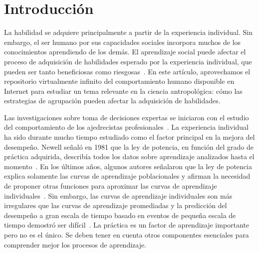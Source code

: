 \documentclass[a4paper,11pt]{book}
\theoremstyle{definition}
\begin{document}
\section{Introducci\'on}

La habilidad se adquiere principalmente a partir de la experiencia individual.
%
Sin embargo, el ser humano por sus capacidades sociales incorpora muchos de los conocimientos aprendiendo de los dem\'as.
%
El aprendizaje social puede afectar el proceso de adquisici\'on de habilidades esperado por la experiencia individual, que pueden ser tanto beneficiosas como riesgosas~\cite{Boyd2011}.
%
En este art\'iculo, aprovechamos el repositorio virtualmente infinito del comportamiento humano disponible en Internet para estudiar un tema relevante en la ciencia antropol\'ogica: c\'omo las estrategias de agrupaci\'on pueden afectar la adquisici\'on de habilidades.


Las investigaciones sobre toma de decisiones expertas se iniciaron con el estudio del comportamiento de los ajedrecistas profesionales~\cite{deGroot1978-thoughtAndChoiceInChess,chase1973-perceptionInChess,simon1974-howBigIsAChunk}.
%
La experiencia individual ha sido durante mucho tiempo estudiado como el factor principal en la mejora del desempe\~no.
%
Newell se\~nal\'o en 1981 que la ley de potencia, en funci\'on del grado de pr\'actica adquirida, describ\'ia todos los datos sobre aprendizaje analizados hasta el momento~\cite{Newell1981}.
%
En los \'ultimos a\~nos, algunos autores se\~nalaron que la ley de potencia explica solamente las curvas de aprendizaje poblacionales y afirman la necesidad de proponer otras funciones para aproximar las curvas de aprendizaje individuales~\cite{heathcote2000-powerLawRepealedExponentialLawOfPractice}.
%
Sin embargo, las curvas de aprendizaje individuales son m\'as irregulares que las curvas de aprendizaje promediadas y la predicci\'on del desempe\~no a gran escala de tiempo basado en eventos de peque\~na escala de tiempo demostr\'o ser dif\'icil~\cite{howard2014-learningCurvesChessPlayersATestOfPowerLawGenerality}.
%
La pr\'actica es un factor de aprendizaje importante pero no es el \'unico.
%
Se deben tener en cuenta otros componentes esenciales para comprender mejor los procesos de aprendizaje.

\end{document}
